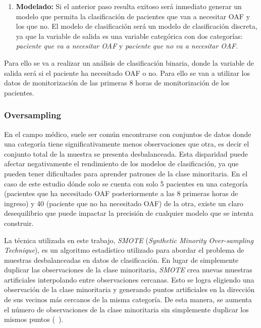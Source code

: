 \begin{enumerate}
    \item \textbf{Modelado:} Si el anterior paso resulta exitoso será inmediato generar un modelo que permita la clasificación de pacientes que van a necesitar OAF y los que no. El modelo de clasificación será un modelo de clasificación discreta, ya que la variable de salida es una variable categórica con dos categorías: \textit{paciente que va a necesitar OAF} y \textit{paciente que no va a necesitar OAF}. 
\end{enumerate}


Para ello se va a realizar un análisis de clasificación binaria, donde la variable de salida será si el paciente ha necesitado OAF o no. Para ello se van a utilizar los datos de monitorización de las primeras $8$ horas de monitorización de los pacientes.











\subsubsection{Oversampling}\label{sec:oversampling}

En el campo médico, suele ser común encontrarse con conjuntos de datos donde una categoría tiene significativamente menos observaciones que otra, es decir el conjunto total de la muestra se presenta desbalanceada. Esta disparidad puede afectar negativamente el rendimiento de los modelos de clasificación, ya que pueden tener dificultades para aprender patrones de la clase minoritaria. En el caso de este estudio dónde solo se cuenta con solo 5 pacientes en una categoría (pacientes que ha necesitado OAF posteriormente a las $8$ primeras horas de ingreso) y 40 (paciente que no ha necesitado OAF) de la  otra, existe un claro desequilibrio que puede impactar la precisión de cualquier modelo que se intenta construir.

La técnica utilizada en este trabajo, \textit{SMOTE} (\textit{Synthetic Minority Over-sampling Technique}), es un algoritmo estadístico utilizado para abordar el problema de muestras desbalanceadas en datos de clasificación. En lugar de simplemente duplicar las observaciones de la clase minoritaria, \textit{SMOTE} crea nuevas muestras artificiales interpolando entre observaciones cercanas. Esto se logra eligiendo una observación de la clase minoritaria y generando puntos artificiales en la dirección de sus vecinos más cercanos de la misma categoría. De esta manera, se aumenta el número de observaciones de la clase minoritaria sin simplemente duplicar los mismos puntos (~\cite{Chawla2002}).
\newpage


\newpage



\newpage